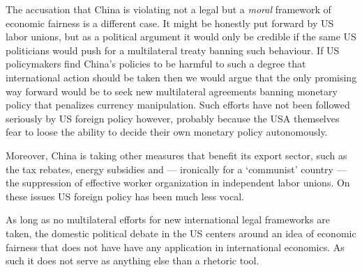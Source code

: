 The accusation that China is violating not a legal but a \emph{moral} 
framework of economic fairness is a different case. It might be honestly 
put forward by US labor unions, but as a political argument it would 
only be credible if the same US politicians would push for a 
multilateral treaty banning such behaviour. If US policymakers find 
China's policies to be harmful to such a degree that international 
action should be taken then we would argue that the only promising way 
forward would be to seek new multilateral agreements banning monetary 
policy that penalizes currency manipulation. Such efforts have not been 
followed seriously by US foreign policy however, probably because the 
USA themselves fear to loose the ability to decide their own monetary 
policy autonomously. 

Moreover, China is taking other measures that benefit its export 
sector, such as the tax rebates, energy subsidies and --- ironically for 
a `communist' country --- the suppression of effective worker 
organization in independent labor unions. On these issues US foreign 
policy has been much less vocal.

As long as no multilateral efforts for new international legal 
frameworks are taken, the domestic political debate in the US centers 
around an idea of economic fairness that does not have have any 
application in international economics. As such it does not serve as 
anything else than a rhetoric tool.%




